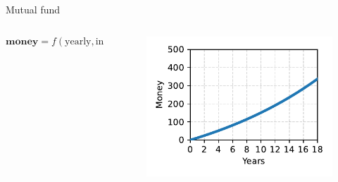 \documentclass[12pt, aspectratio=149]{beamer}
\theoremstyle{plain}
\begin{document}
\begin{frame}[fragile]{Mutual fund}
\begin{columns}
\begin{column}{0.55\textwidth}
    \begin{center}
    \vspace*{-4em}
	\begin{equation*}
	\textbf{money} = f(\text{yearly}, \text{interest\_rate})
	\end{equation*}
     \end{center}
\end{column}
\begin{column}{0.45\textwidth}  %
    \begin{center}
     \begin{figure}
     	\centering
     	\includegraphics[width=0.99\linewidth]{figures/mutual_fund}
     \end{figure}
     \end{center}
\end{column}
\end{columns}
\end{frame}
\end{document}
